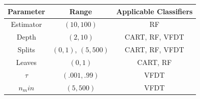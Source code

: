 \documentclass[sigplan]{acmart}\settopmatter{printfolios=true,printccs=false,printacmref=false}
\begin{document}
\begin{center}
	\begin{table}[h]
		\begin{tabular}{|c|c|c|}
			\hline 
			\textbf{Parameter} & \textbf{Range} & \textbf{Applicable Classifiers} \\ 
			\hline 
			Estimator & $(10,100)$ & RF \\ 
			\hline 
			Depth & $(2,10)$ & CART, RF, VFDT \\ 
			\hline 
			Splits & $(0,1)$, $(5,500)$ & CART, RF, VFDT \\ 
			\hline 
			Leaves & $(0,1)$ & CART, RF \\ 
			\hline 
			$\tau$ & $(.001,.99)$ & VFDT \\ 
			\hline 
			$n_min$& $(5,500)$ & VFDT \\ 
			\hline 
		\end{tabular} 
	\end{table}
\end{center}
\end{document}
